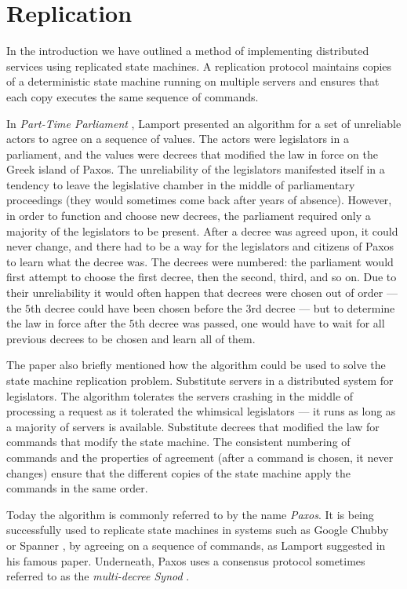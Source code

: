 \documentclass[12pt,a4paper,en]{pracamgr}
\newcommand{\ti}[1]{\textit{#1}}
\begin{document}
\chapter{Replication}\label{replication}

In the introduction we have outlined a method of implementing distributed services using replicated state machines. A replication protocol maintains copies of a deterministic state machine running on multiple servers and ensures that each copy executes the same sequence of commands.

In \ti{Part-Time Parliament} \cite{parttime}, Lamport presented an algorithm for a set of unreliable actors to agree on a sequence of values. The actors were legislators in a parliament, and the values were decrees that modified the law in force on the Greek island of Paxos. The unreliability of the legislators manifested itself in a tendency to leave the legislative chamber in the middle of parliamentary proceedings (they would sometimes come back after years of absence). However, in order to function and choose new decrees, the parliament required only a majority of the legislators to be present. After a decree was agreed upon, it could never change, and there had to be a way for the legislators and citizens of Paxos to learn what the decree was. The decrees were numbered: the parliament would first attempt to choose the first decree, then the second, third, and so on. Due to their unreliability it would often happen that decrees were chosen out of order --- the $5$th decree could have been chosen before the $3$rd decree --- but to determine the law in force after the $5$th decree was passed, one would have to wait for all previous decrees to be chosen and learn all of them.

The paper also briefly mentioned how the algorithm could be used to solve the state machine replication problem. Substitute servers in a distributed system for legislators. The algorithm tolerates the servers crashing in the middle of processing a request as it tolerated the whimsical legislators --- it runs as long as a majority of servers is available. Substitute decrees that modified the law for commands that modify the state machine. The consistent numbering of commands and the properties of agreement (after a command is chosen, it never changes) ensure that the different copies of the state machine apply the commands in the same order.

Today the algorithm is commonly referred to by the name \ti{Paxos}. It is being successfully used to replicate state machines in systems such as Google Chubby \cite{paxoslive} or Spanner \cite{spanner}, by agreeing on a sequence of commands, as Lamport suggested in his famous paper. Underneath, Paxos uses a consensus protocol sometimes referred to as the \ti{multi-decree Synod} \cite{moderatelycomplex}.
\end{document}
